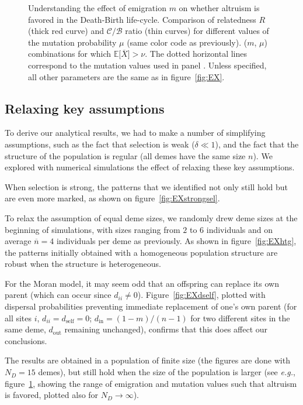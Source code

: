 \documentclass[11pt, letterpaper]{article}
\newcommand{\eg}{\textit{e.g.}}
\newcommand{\Esp}[1]{\mathbb{E}\big[ #1\big]}%
\newcommand{\mutbias}{\nu}
\newcommand{\self}{\textrm{self}}
\newcommand{\inn}{\textrm{in}}
\newcommand{\out}{\textrm{out}}
\newcommand{\din}{d_{\inn}}
\newcommand{\dself}{d_{\self}}
\newcommand{\dout}{d_{\out}}
\newcommand{\ndemes}{N_D}
\newcommand{\selstr}{\delta}
\begin{document}
\begin{figure}
\begin{tabular}{cc}
\end{tabular}
\caption{Understanding the effect of emigration $m$ on whether altruism is favored in the Death-Birth life-cycle.  Comparison of relatedness $R$ (thick red curve) and $\mathcal{C}/\mathcal{B}$ ratio (thin curves) for different values of the mutation probability $\mu$ (same color code as previously).  ($m$, $\mu$) combinations for which $\Esp{\overline{X}}>\mutbias$. The dotted horizontal lines correspond to the mutation values used in panel . Unless specified, all other parameters are the same as in figure~\ref{fig:EX}.
}
\label{fig:DB}
\end{figure}

\subsection{Relaxing key assumptions}

To derive our analytical results, we had to make a number of simplifying assumptions, such as the fact that selection is weak ($\selstr \ll 1$), and the fact that the structure of the population is regular (all demes have the same size $n$). We explored with numerical simulations the effect of relaxing these key assumptions. 

When selection is strong, the patterns that we identified not only still hold but are even more marked, as shown on figure~\ref{fig:EXstrongsel}. 

To relax the assumption of equal deme sizes, we randomly drew deme sizes at the beginning of simulations, with sizes ranging from $2$ to $6$ individuals and on average $\overline{n} = 4$ individuals per deme as previously. As shown in figure~\ref{fig:EXhtg}, the patterns initially obtained with a homogeneous population structure are robust when the structure is heterogeneous. 
 
For the Moran model, it may seem odd that an offspring can replace its own parent (which can occur since $d_{ii} \neq 0$). Figure~\ref{fig:EXdself}, plotted with dispersal probabilities preventing immediate replacement of one's own parent (for all sites $i$, $d_{ii}=\dself=0$; $\din = (1-m)/(n-1)$ for two different sites in the same deme, $\dout$ remaining unchanged), confirms that this does affect our conclusions. 

The results are obtained in a population of finite size (the figures are done with $\ndemes =15$ demes), but still hold when  the size of the population is larger (see \eg, figure~\ref{fig:DB}, showing the range of emigration and mutation values such that altruism is favored, plotted also for $\ndemes\to \infty$).
\end{document}
